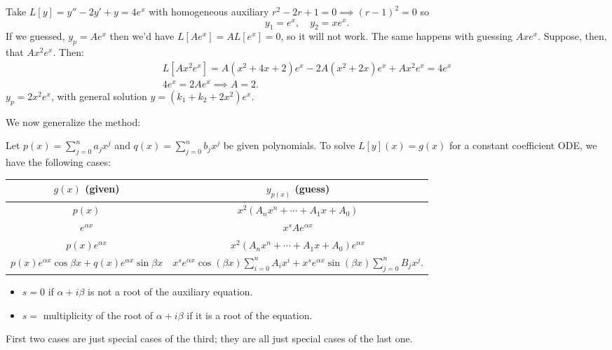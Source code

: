 \begin{example}[Exponential]
    Take $L[y] = y''-2y'+y=4e^x$ with homogeneous auxiliary $r^2 - 2r + 1 = 0 \implies (r-1)^2 = 0$ so $$
    y_1 = e^x, \quad y_2 = xe^x.
    $$
    If we guessed, $y_p = Ae^x$ then we'd have $L[Ae^x] = A L[e^x] = 0$, so it will not work. The same happens with guessing $Axe^x$. Suppose, then, that $Ax^2 e^x$. Then:
    \begin{align*}
        L[Ax^2e^x] = A(x^2 + 4x + 2)e^x - 2A(x^2 + 2x)e^x + Ax^2e^x = 4e^x\\
        4e^x = 2Ae^x \implies A = 2.
    \end{align*}
    $y_p = 2x^2 e^x$, with general solution $y = (k_1 + k_2 + 2x^2)e^x$.
\end{example}

We now generalize the method:

Let $p(x) = \sum_{j=0}^n a_j x^j$ and $q(x) = \sum_{j=0}^n b_j x^j$ be given polynomials. To solve $L[y](x) = g(x)$ for a constant coefficient ODE, we have the following cases:

\begin{table}[!ht]
\begin{tabular*}{\linewidth}{c|c}\centering
    $g(x)$ (given) & $y_{p(x)}$ (guess)\\
    \hline
    $p(x)$ &$ x^2 (A_n x^n + \cdots + A_1 x + A_0)$\\
    $e^{\alpha x} $&  $x^s Ae^{\alpha x}$\\
    $p(x)e^{\alpha x}$ & $x^2 (A_n x^n + \cdots + A_1 x + A_0)e^{\alpha x}$\\
    $p(x)e^{\alpha x} \cos \beta x + q(x)e^{\alpha x} \sin \beta x$ &  $x^s e^{\alpha x} \cos (\beta x) \sum_{i=0}^n A_i x^i  + x^s e^{\alpha x} \sin (\beta x) \sum_{j=0}^n B_j x^j$.
\end{tabular*}
\end{table}

\begin{itemize}
    \item $s = 0$ if $\alpha + i \beta$ is not a root of the auxiliary equation.
    \item $s = $ multiplicity of the root of $\alpha + i \beta$ if it is a root of the equation.
\end{itemize}
\begin{remark}
    First two cases are just special cases of the third; they are all just special cases of the last one.
\end{remark}
